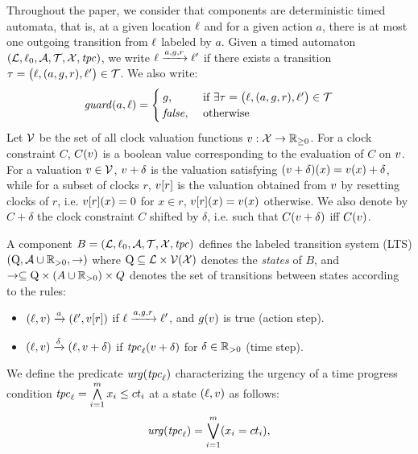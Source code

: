 Throughout the paper, we consider that components are deterministic timed automata, that is, 
at a given location $\ell$ and for a given action $a$, there is at most one outgoing transition from $\ell$ labeled by $a$. 
Given a timed automaton $(\mathcal{L},\ell_0,\mathcal{A},\mathcal{T},\mathcal{X},\mathit{tpc})$, we write $\ell \xrightarrow{a,g,r} \ell'$ 
if there exists a transition $\tau = \big(\ell,(a,g,r),\ell'\big) \in\mathcal{T}$. 
We also write: 
\begin{displaymath}
  \mathit{guard}(a,\ell)=
  \begin{cases}
    g, &\text{ if } \exists\tau = \big(\ell,(a,g,r),\ell'\big) \in\mathcal{T}\\
    \textnormal{\textit{false}}, &\text{ otherwise }
  \end{cases}
\end{displaymath}
Let $\mathcal{V}$ be the set of all clock valuation functions
$v: \mathcal{X}\rightarrow \mathbb{R}_{\ge
  0}$. 
For a clock constraint $C$, $C(v)$ is a boolean value corresponding to the evaluation of $C$ on
$v$. For a valuation $v \in \mathcal{V}$, $v + \delta$ is the valuation satisfying
$(v + \delta)(x) = v(x) + \delta$, while for a subset of clocks $r$, $v[r]$ 
is the valuation obtained from $v$ by resetting clocks of $r$, i.e. 
$v[r](x) = 0$ for $x\in r$, $v[r](x) = v(x)$ otherwise.
We also denote by $C+\delta$ the clock constraint $C$ shifted by $\delta$, i.e. such that $C(v+\delta)$ iff $C(v)$.
\begin{definition}[Semantics]
  \label{def:atom_sem}
  A component $B = (\mathcal{L},\ell_0,\mathcal{A},\mathcal{T},\mathcal{X},\mathit{tpc})$ defines the labeled transition system (LTS) 
  $(\mathrm{Q},\mathcal{A}\cup\mathbb R_{> 0},\to)$ where $\mathrm{Q}\subseteq\mathcal{L}\times\mathcal{V}(\mathcal{X})$ denotes the \emph{states} of $B$, 
  and  $\rightarrow\subseteq\mathrm{Q}\times(A\cup\mathbb R_{> 0}) \times
  Q$ denotes the set of transitions between states according to the rules:
  \begin{itemize}[leftmargin=4mm]
    \item $(\ell,v) \xrightarrow{a} (\ell',v[r])$ if $\ell \xrightarrow{a,g,r} \ell'$, and $g(v)$ is true (action step).
      \item $(\ell,v) \xrightarrow{\delta} (\ell,v+\delta)$ if $\mathit{tpc}_{\ell}(v+\delta)$ for $\delta\in\mathbb R_{> 0}$
      (time step).
    \end{itemize}
\end{definition}
We define the predicate $\textnormal{\textit{urg}}(\mathit{tpc}_{\ell})$ characterizing the urgency of a time progress condition
$\mathit{tpc}_{\ell}=\bigwedge\limits_{i=1}^m x_i\le ct_i$ at a state $(\ell,v)$ as follows:
\begin{displaymath}
\textnormal{\textit{urg}}(\mathit{tpc}_{\ell})=\bigvee_{i=1}^m (x_i=ct_i),
\end{displaymath}
